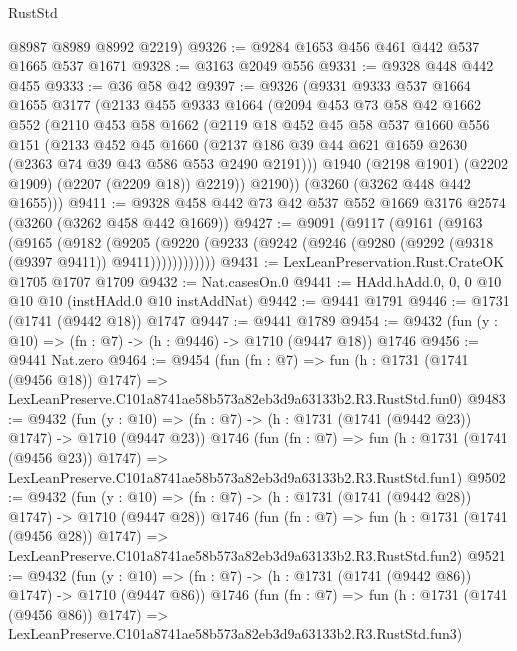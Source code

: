 \begin{lexlean}{RustStd}
\begin{coremodule}
      @8987
      @8989
      @8992
      @2219)
@9326 := @9284 @1653 @456 @461 @442 @537 @1665 @537 @1671
@9328 := @3163 @2049 @556
@9331 := @9328 @448 @442 @455
@9333 := @36 @58 @42
@9397 := @9326
    (@9331
      @9333
      @537
      @1664
      @1655
      @3177
      (@2133
        @455
        @9333
        @1664
        (@2094
          @453
          @73
          @58
          @42
          @1662
          @552
          (@2110
            @453
            @58
            @1662
            (@2119
              @18
              @452
              @45
              @58
              @537
              @1660
              @556
              @151
              (@2133
                @452
                @45
                @1660
                (@2137 @186 @39 @44 @621 @1659 @2630 (@2363 @74 @39 @43 @586 @553 @2490 @2191)))
              @1940
              (@2198 @1901)
              (@2202 @1909)
              (@2207 (@2209 @18))
              @2219))
          @2190))
      (@3260 (@3262 @448 @442 @1655)))
@9411 := @9328 @458 @442 @73 @42 @537 @552 @1669 @3176 @2574 (@3260 (@3262 @458 @442 @1669))
@9427 := @9091
    (@9117
      (@9161
        (@9163
          (@9165
            (@9182
              (@9205
                (@9220 (@9233 (@9242 (@9246 (@9280 (@9292 (@9318 (@9397 @9411)) @9411))))))))))))
@9431 := LexLeanPreservation.Rust.CrateOK @1705 @1707 @1709
@9432 := Nat.casesOn.{0}
@9441 := HAdd.hAdd.{0, 0, 0} @10 @10 @10 (instHAdd.{0} @10 instAddNat)
@9442 := @9441 @1791
@9446 := @1731 (@1741 (@9442 @18)) @1747
@9447 := @9441 @1789
@9454 := @9432 (fun (y : @10) => (fn : @7) -> (h : @9446) -> @1710 (@9447 @18)) @1746
@9456 := @9441 Nat.zero
@9464 := @9454
    (fun (fn : @7) =>
    fun (h : @1731 (@1741 (@9456 @18)) @1747) =>
    LexLeanPreserve.C101a8741ae58b573a82eb3d9a63133b2.R3.RustStd.fun0)
@9483 := @9432
    (fun (y : @10) => (fn : @7) -> (h : @1731 (@1741 (@9442 @23)) @1747) -> @1710 (@9447 @23))
    @1746
    (fun (fn : @7) =>
    fun (h : @1731 (@1741 (@9456 @23)) @1747) =>
    LexLeanPreserve.C101a8741ae58b573a82eb3d9a63133b2.R3.RustStd.fun1)
@9502 := @9432
    (fun (y : @10) => (fn : @7) -> (h : @1731 (@1741 (@9442 @28)) @1747) -> @1710 (@9447 @28))
    @1746
    (fun (fn : @7) =>
    fun (h : @1731 (@1741 (@9456 @28)) @1747) =>
    LexLeanPreserve.C101a8741ae58b573a82eb3d9a63133b2.R3.RustStd.fun2)
@9521 := @9432
    (fun (y : @10) => (fn : @7) -> (h : @1731 (@1741 (@9442 @86)) @1747) -> @1710 (@9447 @86))
    @1746
    (fun (fn : @7) =>
    fun (h : @1731 (@1741 (@9456 @86)) @1747) =>
    LexLeanPreserve.C101a8741ae58b573a82eb3d9a63133b2.R3.RustStd.fun3)

\end{coremodule}
\end{lexlean}
